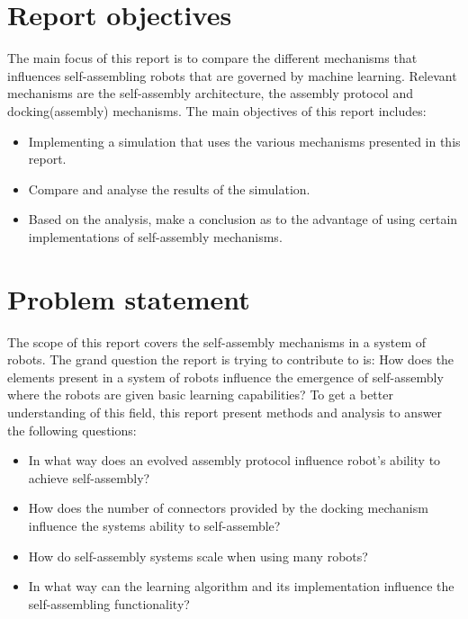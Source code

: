 \section{Report objectives}
The main focus of this report is to compare the different mechanisms that influences self-assembling robots that are governed by machine learning. 
Relevant mechanisms are the self-assembly architecture, the assembly protocol and docking(assembly) mechanisms. 
The main objectives of this report includes:

\begin{itemize}

\item Implementing a simulation that uses the various mechanisms presented in this report.

\item Compare and analyse the results of the simulation. 

\item Based on the analysis, make a conclusion as to the advantage of using certain implementations of self-assembly mechanisms.

\end{itemize}

\section{Problem statement}
The scope of this report covers the self-assembly mechanisms in a system of robots. 
The grand question the report is trying to contribute to is: How does the elements present in a system of robots influence the emergence of self-assembly where the robots are given basic learning capabilities?
To get a better understanding of this field, this report present methods and analysis to answer the following questions:

\begin{itemize}

\item In what way does an evolved assembly protocol influence robot’s ability to achieve self-assembly?

\item How does the number of connectors provided by the docking mechanism influence the systems ability to self-assemble?

\item How do self-assembly systems scale when using many robots?

\item In what way can the learning algorithm and its implementation influence the self-assembling functionality?

\end{itemize}

